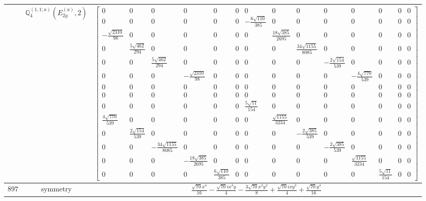 \documentclass[fleqn,8pt,landscape]{jsarticle}
\begin{document}
\begin{longtable}{ccc}
$  $ & $ \mathbb{Q}_{4}^{(1,1;a)}(E_{2g}^{(a)},2) $ & $ \begin{bmatrix} 0 & 0 & 0 & 0 & 0 & 0 & 0 & 0 & 0 & 0 & 0 & 0 & 0 & 0 \\ 0 & 0 & 0 & 0 & 0 & 0 & - \frac{6 \sqrt{110}}{385} & 0 & 0 & 0 & 0 & 0 & 0 & 0 \\ - \frac{\sqrt{2310}}{98} & 0 & 0 & 0 & 0 & 0 & 0 & \frac{18 \sqrt{385}}{2695} & 0 & 0 & 0 & 0 & 0 & 0 \\ 0 & \frac{5 \sqrt{462}}{294} & 0 & 0 & 0 & 0 & 0 & 0 & \frac{34 \sqrt{1155}}{8085} & 0 & 0 & 0 & 0 & 0 \\ 0 & 0 & \frac{5 \sqrt{462}}{294} & 0 & 0 & 0 & 0 & 0 & 0 & - \frac{2 \sqrt{154}}{539} & 0 & 0 & 0 & 0 \\ 0 & 0 & 0 & - \frac{\sqrt{2310}}{98} & 0 & 0 & 0 & 0 & 0 & 0 & - \frac{4 \sqrt{770}}{539} & 0 & 0 & 0 \\ 0 & 0 & 0 & 0 & 0 & 0 & 0 & 0 & 0 & 0 & 0 & 0 & 0 & 0 \\ 0 & 0 & 0 & 0 & 0 & 0 & 0 & 0 & 0 & 0 & 0 & 0 & 0 & 0 \\ 0 & 0 & 0 & 0 & 0 & 0 & \frac{5 \sqrt{11}}{154} & 0 & 0 & 0 & 0 & 0 & 0 & 0 \\ \frac{4 \sqrt{770}}{539} & 0 & 0 & 0 & 0 & 0 & 0 & \frac{\sqrt{1155}}{3234} & 0 & 0 & 0 & 0 & 0 & 0 \\ 0 & \frac{2 \sqrt{154}}{539} & 0 & 0 & 0 & 0 & 0 & 0 & - \frac{2 \sqrt{385}}{539} & 0 & 0 & 0 & 0 & 0 \\ 0 & 0 & - \frac{34 \sqrt{1155}}{8085} & 0 & 0 & 0 & 0 & 0 & 0 & - \frac{2 \sqrt{385}}{539} & 0 & 0 & 0 & 0 \\ 0 & 0 & 0 & - \frac{18 \sqrt{385}}{2695} & 0 & 0 & 0 & 0 & 0 & 0 & \frac{\sqrt{1155}}{3234} & 0 & 0 & 0 \\ 0 & 0 & 0 & 0 & \frac{6 \sqrt{110}}{385} & 0 & 0 & 0 & 0 & 0 & 0 & \frac{5 \sqrt{11}}{154} & 0 & 0 \end{bmatrix} $ \\ \hline
$ 897 $ & $ \text{symmetry} $ & $ \frac{\sqrt{70} x^{4}}{16} - \frac{\sqrt{70} i x^{3} y}{4} - \frac{3 \sqrt{70} x^{2} y^{2}}{8} + \frac{\sqrt{70} i x y^{3}}{4} + \frac{\sqrt{70} y^{4}}{16} $ \\

\end{longtable}
\end{document}
